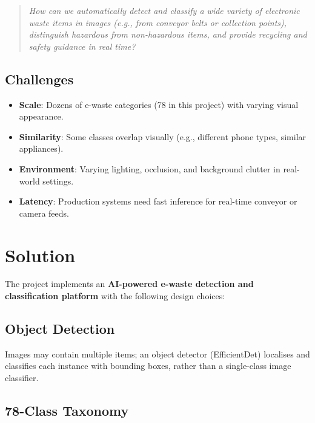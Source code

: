 \documentclass[11pt,a4paper]{article}
\begin{document}
\begin{quote}
    \textit{How can we automatically detect and classify a wide variety of electronic waste items in images (e.g., from conveyor belts or collection points), distinguish hazardous from non-hazardous items, and provide recycling and safety guidance in real time?}
\end{quote}

\subsection{Challenges}

\begin{itemize}[noitemsep]
    \item \textbf{Scale}: Dozens of e-waste categories (78 in this project) with varying visual appearance.
    \item \textbf{Similarity}: Some classes overlap visually (e.g., different phone types, similar appliances).
    \item \textbf{Environment}: Varying lighting, occlusion, and background clutter in real-world settings.
    \item \textbf{Latency}: Production systems need fast inference for real-time conveyor or camera feeds.
\end{itemize}

\section{Solution}
\label{sec:solution}

The project implements an \textbf{AI-powered e-waste detection and classification platform} with the following design choices:

\subsection{Object Detection}

Images may contain multiple items; an object detector (EfficientDet) localises and classifies each instance with bounding boxes, rather than a single-class image classifier.

\subsection{78-Class Taxonomy}
\end{document}
